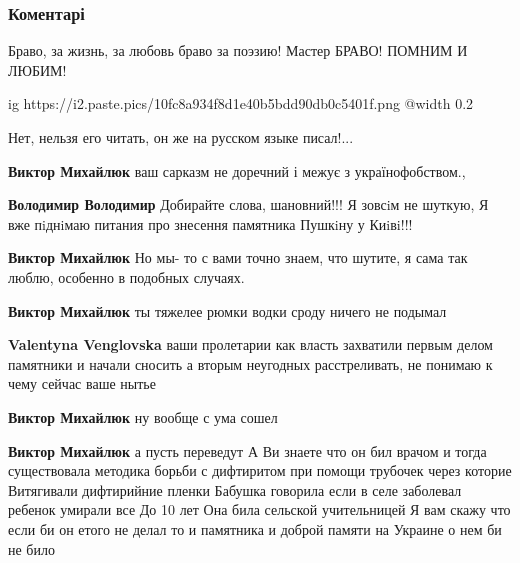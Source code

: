  
 
 
 
 
\subsubsection{Коментарі}
\label{sec:10_03_2021.fb.fb_group.story_kiev_ua.1.bulgakov_smert.cmt}

\begin{itemize} %
Браво, за жизнь, за любовь браво за поэзию! Мастер БРАВО! ПОМНИМ И ЛЮБИМ!

\ifcmt
  ig https://i2.paste.pics/10fc8a934f8d1e40b5bdd90db0c5401f.png
  @width 0.2
\fi

Нет, нельзя его читать, он же на русском языке писал!...

\begin{itemize} %
\textbf{Виктор Михайлюк} ваш сарказм не доречний і межує з українофобством.,

\begin{itemize} %
\textbf{Володимир Володимир} Добирайте слова, шановний!!! Я зовсiм не шуткую, Я вже пiднiмаю питания про знесення памятника Пушкiну у Киiвi!!!

\textbf{Виктор Михайлюк} Но мы- то с вами точно знаем, что шутите, я сама так люблю, особенно в подобных случаях.

\textbf{Виктор Михайлюк} ты тяжелее рюмки водки сроду ничего не подымал

\textbf{Valentyna Venglovska} ваши пролетарии как власть захватили первым делом памятники и начали сносить а вторым неугодных расстреливать, не понимаю к чему сейчас ваше нытье

\textbf{Виктор Михайлюк} ну вообще с ума сошел
\end{itemize} %

\textbf{Виктор Михайлюк} а пусть переведут
А Ви знаете что он бил врачом и тогда существовала методика борьби с дифтиритом при помощи трубочек через которие
Витягивали дифтирийние пленки
Бабушка говорила если в селе заболевал ребенок умирали все
До 10 лет
Она била сельской учительницей
Я вам скажу что если би он етого не делал то и памятника и доброй памяти на Украине о нем би не било


\end{itemize}
\end{itemize}
